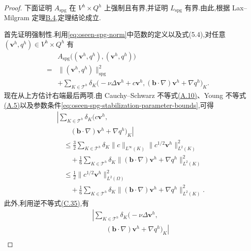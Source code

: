 \begin{proof}
下面证明 $A_{\mathrm{spg}}$ 在 $V^h\times Q^h$ 上强制且有界,并证明 $L_{\mathrm{spg}}$ 有界.由此,根据 Lax--Milgram 定理\hyperref[thm:appendix-b-4]{B.4},定理结论成立.

首先证明强制性.利用\cref{eq:oseen-spg-norm}中范数的定义以及式(5.4),对任意 $(\bm{v}^h,q^h)\in V^h\times Q^h$ 有
\begin{equation}\label{eq:oseen-spg-coercivity-identity}
\begin{aligned}
 &A_{\mathrm{spg}}\bigl((\bm{v}^h,q^h),(\bm{v}^h,q^h)\bigr)\\
  ={}&\|(\bm{v}^h,q^h)\|_{\mathrm{spg}}^2\\
   &+\sum_{K\in\mathcal{T}^h}\delta_K
      \bigl(-\nu\Delta\bm{v}^h+c\bm{v}^h,
       (\bm{b}\cdot\nabla)\bm{v}^h+\nabla q^h\bigr)_K.
\end{aligned}
\end{equation}
现在从上方估计右端最后两项.由 Cauchy--Schwarz 不等式\hyperref[eq:appendix-a-10]{(A.10)}、Young 不等式\hyperref[eq:appendix-a-5]{(A.5)}以及参数条件\cref{eq:oseen-spg-stabilization-parameter-bounds},可得
\begin{equation}\label{eq:oseen-spg-coercivity-reaction-bound}
\begin{aligned}
 &\left|\sum_{K\in\mathcal{T}^h}\delta_K
   \bigl(c\bm{v}^h,\right.\\
 &\left.\qquad(\bm{b}\cdot\nabla)\bm{v}^h+\nabla q^h\bigr)_K\right|\\
 &\quad\le \frac{3}{2}\sum_{K\in\mathcal{T}^h}
      \delta_K\|c\|_{L^\infty(K)}
      \|c^{1/2}\bm{v}^h\|_{L^2(K)}^2\\
 &\qquad+\frac{1}{6}\sum_{K\in\mathcal{T}^h}\delta_K
       \|(\bm{b}\cdot\nabla)\bm{v}^h+\nabla q^h\|_{L^2(K)}^2\\
 &\quad\le \frac{1}{2}\|c^{1/2}\bm{v}^h\|_{L^2(\Omega)}^2\\
 &\qquad+\frac{1}{6}\sum_{K\in\mathcal{T}^h}\delta_K
       \|(\bm{b}\cdot\nabla)\bm{v}^h+\nabla q^h\|_{L^2(K)}^2.
\end{aligned}
\end{equation}
此外,利用逆不等式\hyperref[eq:appendix-c-35]{(C.35)},有
\begin{equation}\label{eq:oseen-spg-coercivity-diffusion-bound}
\begin{aligned}
 &\left|\sum_{K\in\mathcal{T}^h}\delta_K
   \bigl(-\nu\Delta\bm{v}^h,\right.\\
 &\left.\qquad(\bm{b}\cdot\nabla)\bm{v}^h+\nabla q^h\bigr)_K\right|\\

\end{aligned}
\end{equation}
\end{proof}
